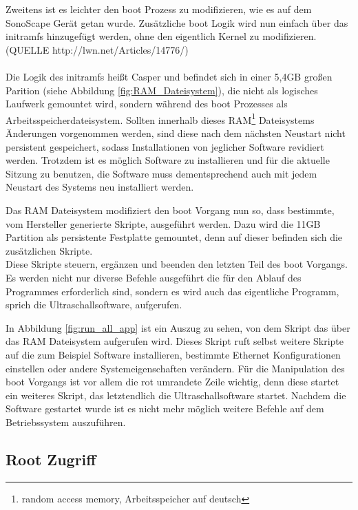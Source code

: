 Zweitens ist es leichter den boot Prozess zu modifizieren, wie es auf dem SonoScape Gerät getan wurde. Zusätzliche boot Logik wird nun einfach über das initramfs hinzugefügt werden, ohne den eigentlich Kernel zu modifizieren. (QUELLE http://lwn.net/Articles/14776/)\\\\
Die Logik des initramfs heißt Casper und befindet sich in einer 5,4GB großen Parition (siehe Abbildung \ref{fig:RAM_Dateisystem}), die nicht als logisches Laufwerk gemountet wird, sondern während des boot Prozesses als Arbeitsspeicherdateisystem. Sollten innerhalb dieses RAM\footnote{random access memory, Arbeitsspeicher auf deutsch} Dateisystems Änderungen vorgenommen werden, sind diese nach dem nächsten Neustart nicht persistent gespeichert, sodass Installationen von jeglicher Software revidiert werden. Trotzdem ist es möglich Software zu installieren und für die aktuelle Sitzung zu benutzen, die Software muss dementsprechend auch mit jedem Neustart des Systems neu installiert werden.

Das RAM Dateisystem modifiziert den boot Vorgang nun so, dass bestimmte, vom Hersteller generierte  Skripte, ausgeführt werden. Dazu wird die 11GB Partition als persistente Festplatte gemountet, denn auf dieser befinden sich die zusätzlichen Skripte.\\
Diese Skripte steuern, ergänzen und beenden den letzten Teil des boot Vorgangs. Es werden nicht nur diverse Befehle ausgeführt die für den Ablauf des Programmes erforderlich sind, sondern es wird auch das eigentliche Programm, sprich die Ultraschallsoftware, aufgerufen.

In Abbildung \ref{fig:run_all_app} ist ein Auszug zu sehen, von dem Skript das über das RAM Dateisystem aufgerufen wird. Dieses Skript ruft selbst weitere Skripte auf die zum Beispiel Software installieren, bestimmte Ethernet Konfigurationen einstellen oder andere Systemeigenschaften verändern. Für die Manipulation des boot Vorgangs ist vor allem die rot umrandete Zeile wichtig, denn diese startet ein weiteres Skript, das letztendlich die Ultraschallsoftware startet. Nachdem die Software gestartet wurde ist es nicht mehr möglich weitere Befehle auf dem Betriebssystem auszuführen.\\

\subsection{Root Zugriff}


